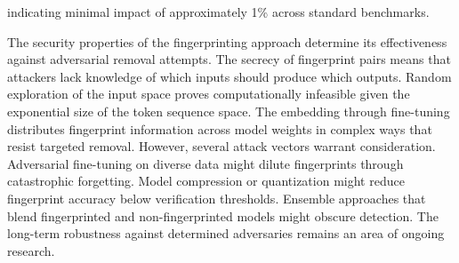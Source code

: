 indicating minimal impact of approximately 1\% across standard benchmarks.

The security properties of the fingerprinting approach determine its effectiveness against adversarial removal attempts. The secrecy of fingerprint pairs means that attackers lack knowledge of which inputs should produce which outputs. Random exploration of the input space proves computationally infeasible given the exponential size of the token sequence space. The embedding through fine-tuning distributes fingerprint information across model weights in complex ways that resist targeted removal. However, several attack vectors warrant consideration. Adversarial fine-tuning on diverse data might dilute fingerprints through catastrophic forgetting. Model compression or quantization might reduce fingerprint accuracy below verification thresholds. Ensemble approaches that blend fingerprinted and non-fingerprinted models might obscure detection. The long-term robustness against determined adversaries remains an area of ongoing research.

